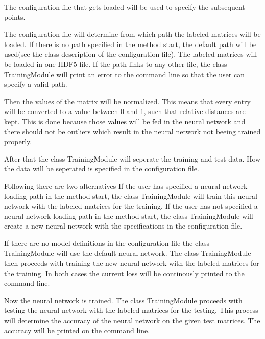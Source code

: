 \documentclass[parskip=full]{scrartcl}
\begin{document}
The configuration file that gets loaded will be used to specify the subsequent points.\newline

The configuration file will determine from which path the labeled matrices will be loaded.
If there is no path specified in the method start, the default path will be used(see the class description of the configuration file).
The labeled matrices will be loaded in one \gls{HDF5} file.
If the path links to any other file, the class TrainingModule will print an error to the command line so that the user can specify a valid path. \newline

Then the values of the matrix will be normalized.
This means that every entry will be converted to a value between 0 and 1, such that relative distances are kept.
This is done because those values will be fed in the \gls{neural network} and there should not be outliers which result in the \gls{neural network} not beeing trained properly.

After that the class TrainingModule will seperate the training and test data.
How the data will be seperated is specified in the configuration file.\newline

Following there are two alternatives
 If the user has specified a \gls{neural network} loading path in the method start, the class TrainingModule will train this \gls{neural network} with the labeled matrices for the training.
If the user has not specified a \gls{neural network}  loading path in the method start, the class TrainingModule will create a new \gls{neural network} with the specifications in the configuration file.\newline

If there are no model definitions in the configuration file the class TrainingModule will use the \gls{default neural network}.
The class TrainingModule then proceeds with training the new \gls{neural network} with the labeled matrices for the training.
In both cases the current loss will be continously printed to the command line.\newline

Now the \gls{neural network} is trained. The class TrainingModule proceeds with testing the \gls{neural network} with the labeled matrices for the testing.
This process will determine the accuracy of the \gls{neural network} on the given test matrices.
The accuracy will be printed on the command line.\newline
\end{document}
